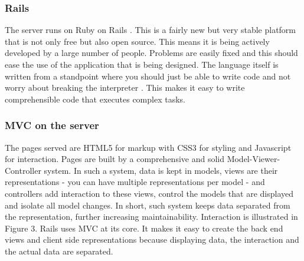 \documentclass{report}
\begin{document}
				\subsubsection{Rails}
					The server runs on Ruby on Rails \cite{ror} . This is a fairly new but very stable platform that is not only free but also open source. This means it is being actively developed by a large number of people. Problems are easily fixed and this should ease the use of the application that is being designed. The language itself is written from a standpoint where you should just be able to write code and not worry about breaking the interpreter \cite{ruby} . This makes it easy to write comprehensible code that executes complex tasks.
								
				\subsubsection{MVC on the server}
					The pages served are HTML5 for markup with CSS3 for styling and Javascript for interaction. Pages are built by a comprehensive and solid Model-Viewer-Controller system. In such a system, data is kept in models, views are their representations - you can have multiple representations per model - and controllers add interaction to these views, control the models that are displayed and isolate all model changes. In short, such system keeps data separated from the representation, further increasing maintainability. Interaction is illustrated in Figure 3. Rails uses MVC at its core. It makes it easy to create the back end views and client side representations because displaying data, the interaction and the actual data are separated.
					
\end{document}
